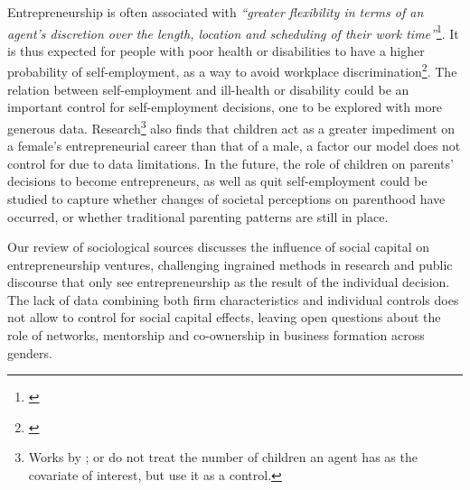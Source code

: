 Entrepreneurship is often associated with \textit{``greater flexibility in terms of an agent's discretion over the length, location and scheduling of their work time''}\footnote{\cite{Quinn1980}}. It is thus expected for people with poor health or disabilities to have a higher probability of self-employment, as a way to avoid workplace discrimination\footnote{\cite{Quinn1980}}. The relation between self-employment and ill-health or disability could be an important control for self-employment decisions, one to be explored with more generous data. Research\footnote{ Works by \cite{BurkeFitzroyNolan2002}; \cite{GeorgellisWall2005} or \cite{CowlingTaylor2001} do not treat the number of children an agent has as the covariate of interest, but use it as a control.} also finds that children act as a greater impediment on a female's entrepreneurial career than that of a male, a factor our model does not control for due to data limitations. In the future, the role of children on parents' decisions to become entrepreneurs, as well as quit self-employment could be studied to capture whether changes of societal perceptions on parenthood have occurred, or whether traditional parenting patterns are still in place.  

Our review of sociological sources discusses the influence of social capital on entrepreneurship ventures, challenging ingrained methods in research and public discourse that only see entrepreneurship as the result of the individual decision. The lack of data combining both firm characteristics and individual controls does not allow to control for social capital effects, leaving open questions about the role of networks, mentorship and co-ownership in business formation across genders.














